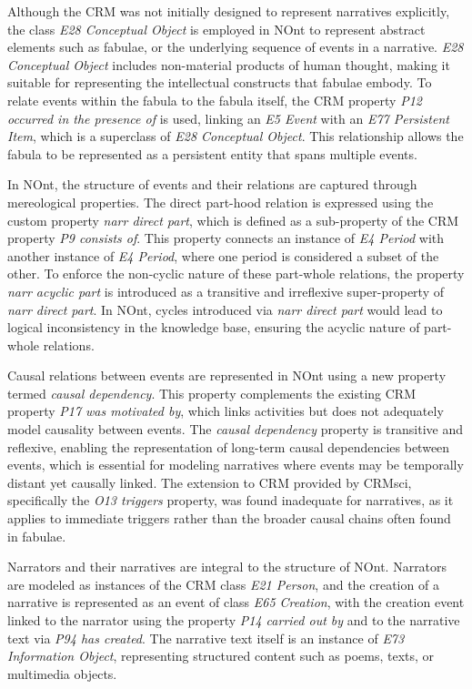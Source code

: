 Although the CRM was not initially designed to represent narratives explicitly, the class \textit{E28 Conceptual Object} is employed in NOnt to represent abstract elements such as fabulae, or the underlying sequence of events in a narrative. \textit{E28 Conceptual Object} includes non-material products of human thought, making it suitable for representing the intellectual constructs that fabulae embody. To relate events within the fabula to the fabula itself, the CRM property \textit{P12 occurred in the presence of} is used, linking an \textit{E5 Event} with an \textit{E77 Persistent Item}, which is a superclass of \textit{E28 Conceptual Object}. This relationship allows the fabula to be represented as a persistent entity that spans multiple events.

In NOnt, the structure of events and their relations are captured through mereological properties. The direct part-hood relation is expressed using the custom property \textit{narr direct part}, which is defined as a sub-property of the CRM property \textit{P9 consists of}. This property connects an instance of \textit{E4 Period} with another instance of \textit{E4 Period}, where one period is considered a subset of the other. To enforce the non-cyclic nature of these part-whole relations, the property \textit{narr acyclic part} is introduced as a transitive and irreflexive super-property of \textit{narr direct part}. In NOnt, cycles introduced via \textit{narr direct part} would lead to logical inconsistency in the knowledge base, ensuring the acyclic nature of part-whole relations.

Causal relations between events are represented in NOnt using a new property termed \textit{causal dependency}. This property complements the existing CRM property \textit{P17 was motivated by}, which links activities but does not adequately model causality between events. The \textit{causal dependency} property is transitive and reflexive, enabling the representation of long-term causal dependencies between events, which is essential for modeling narratives where events may be temporally distant yet causally linked. The extension to CRM provided by CRMsci, specifically the \textit{O13 triggers} property, was found inadequate for narratives, as it applies to immediate triggers rather than the broader causal chains often found in fabulae.

Narrators and their narratives are integral to the structure of NOnt. Narrators are modeled as instances of the CRM class \textit{E21 Person}, and the creation of a narrative is represented as an event of class \textit{E65 Creation}, with the creation event linked to the narrator using the property \textit{P14 carried out by} and to the narrative text via \textit{P94 has created}. The narrative text itself is an instance of \textit{E73 Information Object}, representing structured content such as poems, texts, or multimedia objects.

